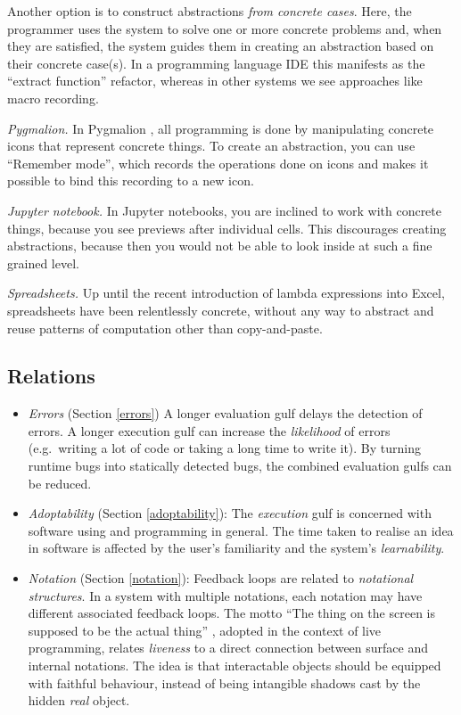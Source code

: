 \documentclass[ twoside,openright,titlepage,numbers=noenddot,headinclude,footinclude,cleardoublepage=empty,abstract=on,
                BCOR=5mm,paper=a4,fontsize=11pt
                ]{scrreprt}
\providecommand{\tightlist}{}\newenvironment{longtable}[2]{\begin{tabular}}{\end{tabular}}
\theoremstyle{definition}
\begin{document}
Another option is to construct abstractions \emph{from concrete cases}.
Here, the programmer uses the system to solve one or more concrete
problems and, when they are satisfied, the system guides them in
creating an abstraction based on their concrete case(s). In a
programming language IDE this manifests as the ``extract function''
refactor, whereas in other systems we see approaches like macro
recording.

\emph{Pygmalion.} In Pygmalion \parencite{Pygmalion}, all programming is
done by manipulating concrete icons that represent concrete things. To
create an abstraction, you can use ``Remember mode'', which records the
operations done on icons and makes it possible to bind this recording to
a new icon.

\emph{Jupyter notebook.} In Jupyter notebooks, you are inclined to work
with concrete things, because you see previews after individual cells.
This discourages creating abstractions, because then you would not be
able to look inside at such a fine grained level.

\emph{Spreadsheets.} Up until the recent introduction of lambda
expressions into Excel, spreadsheets have been relentlessly concrete,
without any way to abstract and reuse patterns of computation other than
copy-and-paste.

\hypertarget{relations}{\subsection{Relations}\label{relations}}

\begin{itemize}
\tightlist
\item
  \emph{Errors} (Section \ref{errors}) A longer evaluation gulf delays
  the detection of errors. A longer execution gulf can increase the
  \emph{likelihood} of errors (e.g.~writing a lot of code or taking a
  long time to write it). By turning runtime bugs into statically
  detected bugs, the combined evaluation gulfs can be reduced.
\item
  \emph{Adoptability} (Section \ref{adoptability}): The \emph{execution}
  gulf is concerned with software using and programming in general. The
  time taken to realise an idea in software is affected by the user's
  familiarity and the system's \emph{learnability}.
\item
  \emph{Notation} (Section \ref{notation}): Feedback loops are related
  to \emph{notational structures}. In a system with multiple notations,
  each notation may have different associated feedback loops. The motto
  ``The thing on the screen is supposed to be the actual thing''
  \parencite{NakedObjects}, adopted in the context of live programming,
  relates \emph{liveness} to a direct connection between surface and
  internal notations. The idea is that interactable objects should be
  equipped with faithful behaviour, instead of being intangible shadows
  cast by the hidden \emph{real} object.
\end{itemize}
\end{document}
